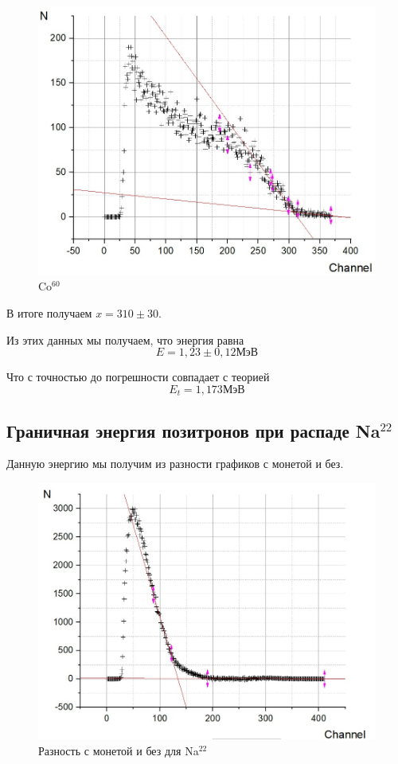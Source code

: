 \documentclass[a4paper, 12pt]{article}%
\begin{document}
\begin{figure}[h]
\begin{center}
\includegraphics[width = \textwidth]{14.jpg}
\caption{Co$^{60}$}
\end{center}
\end{figure}

В итоге получаем $x = 310 \pm 30$.

Из этих данных мы получаем, что энергия равна 
\[E = 1,23 \pm 0,12 \text{МэВ}\]

Что с точностью до погрешности совпадает с теорией
\[E_t = 1,173 \text{МэВ}\]
\newpage
\subsection*{Граничная энергия позитронов при распаде Na$^{22}$}
Данную энергию мы получим из разности графиков с монетой и без.

\begin{figure}[h]
\begin{center}
\includegraphics[width = \textwidth]{15.jpg}
\caption{Разность с монетой и без для Na$^{22}$}
\end{center}
\end{figure}
\end{document}
